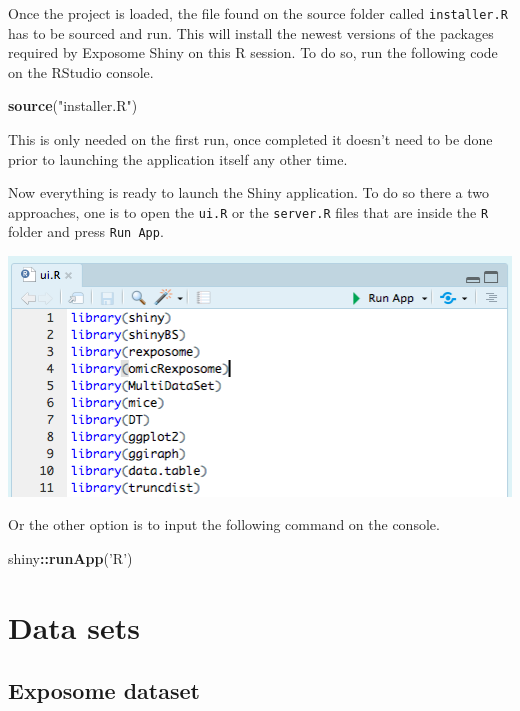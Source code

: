 \documentclass[
]{book}
\newenvironment{Shaded}{\begin{snugshade}}{\end{snugshade}}
\newcommand{\KeywordTok}[1]{\textcolor[rgb]{0.13,0.29,0.53}{\textbf{#1}}}
\newcommand{\NormalTok}[1]{#1}
\newcommand{\OperatorTok}[1]{\textcolor[rgb]{0.81,0.36,0.00}{\textbf{#1}}}
\newcommand{\StringTok}[1]{\textcolor[rgb]{0.31,0.60,0.02}{#1}}
\begin{document}
Once the project is loaded, the file found on the source folder called \texttt{installer.R} has to be sourced and run. This will install the newest versions of the packages required by Exposome Shiny on this R session. To do so, run the following code on the RStudio console.

\begin{Shaded}
\begin{Highlighting}[]
\KeywordTok{source}\NormalTok{(}\StringTok{"installer.R"}\NormalTok{)}
\end{Highlighting}
\end{Shaded}

This is only needed on the first run, once completed it doesn't need to be done prior to launching the application itself any other time.

Now everything is ready to launch the Shiny application. To do so there a two approaches, one is to open the \texttt{ui.R} or the \texttt{server.R} files that are inside the \texttt{R} folder and press \texttt{Run\ App}.

\includegraphics{images/setup2.png}

Or the other option is to input the following command on the console.

\begin{Shaded}
\begin{Highlighting}[]
\NormalTok{shiny}\OperatorTok{::}\KeywordTok{runApp}\NormalTok{(}\StringTok{'R'}\NormalTok{)}
\end{Highlighting}
\end{Shaded}

\hypertarget{data-sets}{%
\chapter{Data sets}\label{data-sets}}

\hypertarget{exposome-dataset}{%
\section{Exposome dataset}\label{exposome-dataset}}
\end{document}

